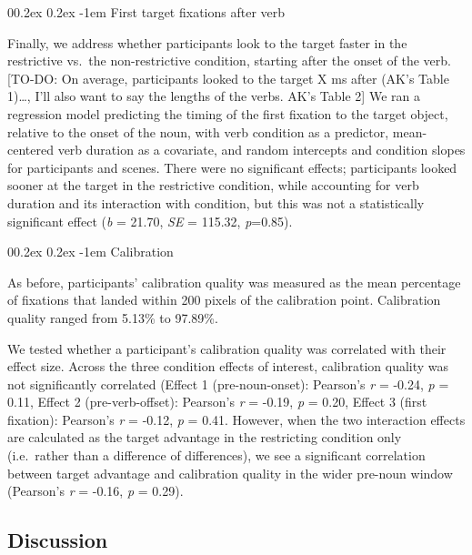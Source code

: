 \documentclass[
  man,floatsintext]{apa6}
\makeatletter
\let\oldparagraph\paragraph
\renewcommand{\paragraph}[1]{\oldparagraph{#1}\mbox{}}
\renewcommand{\paragraph}{\@startsection{paragraph}{4}{\parindent}%
  {0\baselineskip \@plus 0.2ex \@minus 0.2ex}%
  {-1em}%
  {\normalfont\normalsize\bfseries\itshape\typesectitle}}
\makeatother
\begin{document}
\hypertarget{first-target-fixations-after-verb-1}{%
\paragraph{First target fixations after verb}\label{first-target-fixations-after-verb-1}}

Finally, we address whether participants look to the target faster in the restrictive vs.~the non-restrictive condition, starting after the onset of the verb. {[}TO-DO: On average, participants looked to the target X ms after (AK's Table 1)\ldots, I'll also want to say the lengths of the verbs. AK's Table 2{]} We ran a regression model predicting the timing of the first fixation to the target object, relative to the onset of the noun, with verb condition as a predictor, mean-centered verb duration as a covariate, and random intercepts and condition slopes for participants and scenes. There were no significant effects; participants looked sooner at the target in the restrictive condition, while accounting for verb duration and its interaction with condition, but this was not a statistically significant effect (\emph{b} = 21.70, \emph{SE} = 115.32, \emph{p}=0.85).

\hypertarget{calibration-1}{%
\paragraph{Calibration}\label{calibration-1}}

As before, participants' calibration quality was measured as the mean percentage of fixations that landed within 200 pixels of the calibration point. Calibration quality ranged from 5.13\% to 97.89\%.

We tested whether a participant's calibration quality was correlated with their effect size. Across the three condition effects of interest, calibration quality was not significantly correlated (Effect 1 (pre-noun-onset): Pearson's \emph{r} = -0.24, \emph{p} = 0.11, Effect 2 (pre-verb-offset): Pearson's \emph{r} = -0.19, \emph{p} = 0.20, Effect 3 (first fixation): Pearson's \emph{r} = -0.12, \emph{p} = 0.41. However, when the two interaction effects are calculated as the target advantage in the restricting condition only (i.e.~rather than a difference of differences), we see a significant correlation between target advantage and calibration quality in the wider pre-noun window (Pearson's \emph{r} = -0.16, \emph{p} = 0.29).

\hypertarget{discussion}{%
\subsection{Discussion}\label{discussion}}
\end{document}
